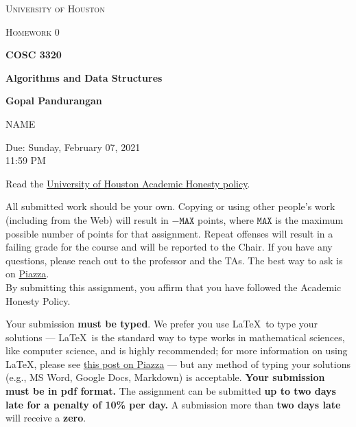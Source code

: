\documentclass[final]{article}
\begin{document}
\begin{titlepage}
    \begin{center}
        {\scshape\LARGE University of Houston\par}
        \vspace{1cm}
        {\scshape\Large Homework 0 \par}
        \vspace{1.5cm}
        {\huge\bfseries COSC 3320 \par}
        {\huge\bfseries Algorithms and Data Structures \par}
        \vspace{0.5cm}
        {\large\bfseries Gopal Pandurangan\par}
        \vspace{2cm}
        {\Large NAME\par}
        \vspace{0.5cm}
        {\large \par} Due: Sunday, February 07, 2021\\11:59 PM
    \end{center}


    Read the \href{https://www.uh.edu/provost/policies-resources/honesty/_documents-honesty/academic-honesty-policy.pdf}{University of Houston Academic Honesty policy}.

    \begin{tcolorbox}[title=Academic Honesty Policy,colback=red!15,colframe=red!65!black,fonttitle=\bfseries]All submitted work should be your own. Copying or using other people's work (including from the Web) will result in \(-\texttt{MAX}\) points, where \(\texttt{MAX}\) is the maximum possible number of points for that assignment. Repeat offenses will result in a failing grade for the course and will be reported to the Chair. If you have any questions, please reach out to the professor and the TAs. The best way to ask is on \href{https://piazza.com/uh/spring2021/cosc3320/home}{Piazza}.\\

        By submitting this assignment, you affirm that you have followed the Academic Honesty Policy.
    \end{tcolorbox}

    Your submission \textbf{must be typed}. We prefer you use \LaTeX~to type your solutions --- \LaTeX~is the standard way to type works in mathematical sciences, like computer science, and is highly recommended; for more information on using \LaTeX, please see \href{https://piazza.com/class/kjxhee6ctqe6cj?cid=8}{this post on Piazza} --- but any method of typing your solutions (e.g., MS Word, Google Docs, Markdown) is acceptable. \textbf{Your submission must be in pdf format.} The assignment can be submitted \textbf{up to two days late for a penalty of 10\% per day.} A submission more than \textbf{two days late} will receive a \textbf{zero}.


\end{titlepage}
\end{document}
